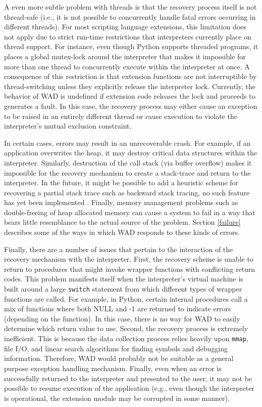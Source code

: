 A even more subtle problem with threads is that the recovery process
itself is not thread-safe (i.e., it is not possible to concurrently
handle fatal errors occurring in different threads).  For most
scripting language extensions, this limitation does not apply due to
strict run-time restrictions that interpreters currently place on
thread support.  For instance, even though Python supports threaded
programs, it places a global mutex-lock around the interpreter that
makes it impossible for more than one thread to concurrently execute
within the interpreter at once. A consequence of this restriction is
that extension functions are not interruptible by thread-switching
unless they explicitly release the interpreter lock.  Currently, the
behavior of WAD is undefined if extension code releases the lock and
proceeds to generates a fault.  In this case, the recovery process may
either cause an exception to be raised in an entirely different
thread or cause execution to violate the interpreter's mutual exclusion
constraint.

In certain cases, errors may result in an unrecoverable crash.  For
example, if an application overwrites the heap, it may destroy
critical data structures within the interpreter.  Similarly,
destruction of the call stack (via buffer overflow) makes it
impossible for the recovery mechanism to create a stack-trace and
return to the interpreter.  In the future, it might be possible to add
a heuristic scheme for recovering a partial stack trace such as
backward stack tracing, no such feature has yet been implemented
\cite{debug}.  Finally, memory management problems such as
double-freeing of heap allocated memory can cause a system to fail in
a way that bears little resemblance to the actual source of the
problem.  Section \ref{failure} describes some of the ways in which WAD responds
to these kinds of errors.

%
%

Finally, there are a number of issues that pertain
to the interaction of the recovery mechanism with the interpreter.
First, the recovery scheme is unable to return to procedures
that might invoke wrapper functions with conflicting return codes.
This problem manifests itself when the interpreter's virtual
machine is built around a large {\tt switch} statement from which different
types of wrapper functions are called.  For example, in Python, certain
internal procedures call a mix of functions where both NULL and -1 are
returned to indicate errors (depending on the function).  In this case, there
is no way for WAD to easily determine which return value to use.  Second,
the recovery process is extremely inefficient.  This is because the
data collection process relies heavily upon {\tt mmap}, file I/O, and linear search
algorithms for finding symbols and debugging information.  Therefore, WAD would
probably not be suitable as a general purpose exception handling mechanism.
Finally, even when an error is successfully returned to the interpreter
and presented to the user, it may not be possible to resume execution of
the application (e.g., even though the interpreter is operational, the extension
module may be corrupted in some manner).

